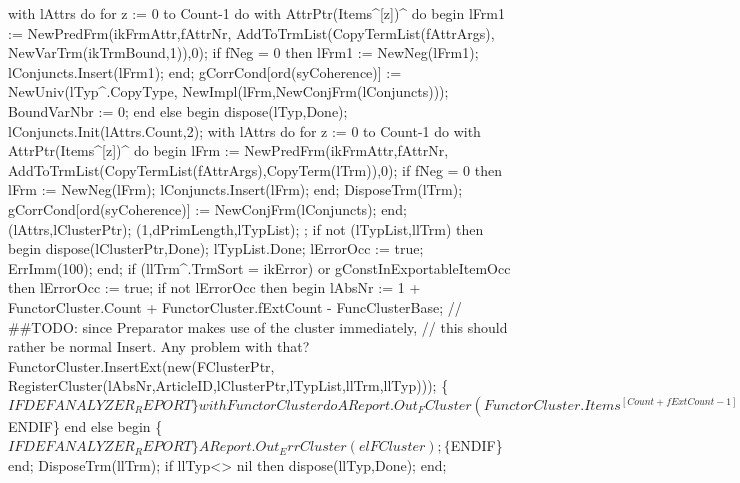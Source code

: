       with lAttrs do
         for z := 0 to Count-1 do
            with AttrPtr(Items^[z])^ do
         begin
            lFrm1 := NewPredFrm(ikFrmAttr,fAttrNr,
                                AddToTrmList(CopyTermList(fAttrArgs),
                                             NewVarTrm(ikTrmBound,1)),0);
            if fNeg = 0 then
               lFrm1 := NewNeg(lFrm1);
            lConjuncts.Insert(lFrm1);
         end;
      gCorrCond[ord(syCoherence)] := NewUniv(lTyp^.CopyType,
                                             NewImpl(lFrm,NewConjFrm(lConjuncts)));
      BoundVarNbr := 0;
   end
   else
   begin
      dispose(lTyp,Done);
      lConjuncts.Init(lAttrs.Count,2);
      with lAttrs do
         for z := 0 to Count-1 do
            with AttrPtr(Items^[z])^ do
         begin
            lFrm := NewPredFrm(ikFrmAttr,fAttrNr,
                               AddToTrmList(CopyTermList(fAttrArgs),CopyTerm(lTrm)),0);
            if fNeg = 0 then
               lFrm := NewNeg(lFrm);
            lConjuncts.Insert(lFrm);
         end;
      DisposeTrm(lTrm);
      gCorrCond[ord(syCoherence)] := NewConjFrm(lConjuncts);
   end;
   (lAttrs,lClusterPtr);
   (1,dPrimLength,lTypList);
   ;
   if not (lTypList,llTrm) then
   begin
      dispose(lClusterPtr,Done);
      lTypList.Done;
      lErrorOcc := true;
      ErrImm(100);
   end;
   if (llTrm^.TrmSort = ikError) or gConstInExportableItemOcc then lErrorOcc := true;
   if not lErrorOcc then
   begin
      lAbsNr :=  1 + FunctorCluster.Count +  FunctorCluster.fExtCount - FuncClusterBase;
      // ##TODO: since Preparator makes use of the cluster immediately,
      //         this should rather be normal Insert. Any problem with that?
      FunctorCluster.InsertExt(new(FClusterPtr,
                                   RegisterCluster(lAbsNr,ArticleID,lClusterPtr,lTypList,llTrm,llTyp)));
      \{$IFDEF ANALYZER_REPORT\}
      with FunctorCluster do
         AReport.Out_FCluster(FunctorCluster.Items^[Count+fExtCount-1]);
      \{$ENDIF\}
   end
   else
   begin
      \{$IFDEF ANALYZER_REPORT\}
      AReport.Out_ErrCluster(elFCluster);
      \{$ENDIF\}
   end;
   DisposeTrm(llTrm);
   if llTyp<> nil
   then dispose(llTyp,Done);
end;
\eatline
